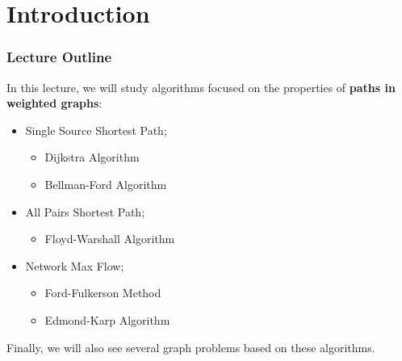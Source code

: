 \section{Introduction}

\begin{frame}
  \frametitle{Lecture Outline}
  In this lecture, we will study algorithms focused on the properties of {\bf paths in weighted graphs}:\bigskip

    \begin{itemize}
    \item Single Source Shortest Path;
    \begin{itemize}
      \item Dijkstra Algorithm
      \item Bellman-Ford Algorithm
    \end{itemize}

    \item All Pairs Shortest Path;
    \begin{itemize}
      \item Floyd-Warshall Algorithm
    \end{itemize}

    \item Network Max Flow;
    \begin{itemize}
      \item Ford-Fulkerson Method
      \item Edmond-Karp Algorithm
    \end{itemize}
    \end{itemize}
  \bigskip

  Finally, we will also see several graph problems based on these algorithms.

\end{frame}
